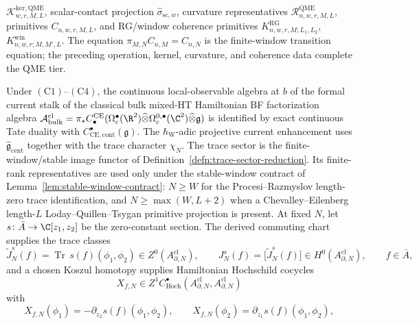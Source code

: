 \documentclass[11pt]{memoir}
\begin{document}
\begin{thm}
\begin{enumerate}[label=\textup{(\roman*)}]
      \(\mathcal K^{\mathrm{ker,QME}}_{w,r,M,L}\), scalar-contact
      projection \(\widehat\sigma_{\mathrm{sc},w}\), curvature
      representatives \(\mathcal R^{\mathrm{QME}}_{n,w,r,M,L}\),
      primitives \(C_{n,w,r,M,L}\), and RG/window coherence primitives
      \(K^{\mathrm{RG}}_{n,w,r,M;L_1,L_2}\),
      \(K^{\mathrm{win}}_{n,w,r;M,M',L}\).  The equation
      \(\pi_{M,N}C_{n,M}=C_{n,N}\) is the finite-window transition
      equation; the preceding operation, kernel, curvature, and
      coherence data complete the QME tier.
  \end{enumerate}
  Under \(\mathrm{(C1)}\)--\(\mathrm{(C4)}\), the continuous
  local-observable algebra at \(b\) of the formal
  current stalk of the classical bulk mixed-HT Hamiltonian BF factorization algebra
  $\mathcal A^{\mathrm{cl}}_{\mathrm{bulk}}=\pi_*
  C^{\mathrm{CE}}_\bullet(\Omega^\bullet_c(\R^2)
  \widehat\otimes\Omega^{0,\bullet}_c(\C^2)
  \widehat\otimes\mathfrak g)$
  is identified by exact continuous Tate duality with
  \(C^\bullet_{\mathrm{CE},\mathrm{cont}}(\mathfrak g)\).  The
  \(\hbar_{\mathrm W}\)-adic projective current enhancement uses
  \(\widehat{\mathfrak g}_{\mathrm{cent}}\) together with the trace
  character \(\chi_N\).  The trace sector is the
  finite-window/stable image functor of
  Definition~\ref{defn:trace-sector-reduction}.  Its finite-rank
  representatives are used only under the stable-window contract of
  Lemma~\ref{lem:stable-window-contract}: \(N\geq W\) for the
  Procesi--Razmyslov length-zero trace identification, and
  \(N\geq\max(W,L+2)\) when a Chevalley--Eilenberg length-\(L\)
  Loday--Quillen--Tsygan primitive projection is present.  At fixed
  \(N\), let \(s\colon\bar A\to\C[z_1,z_2]\) be the zero-constant
  section.  The derived commuting chart supplies the trace classes
  \begin{equation}\label{eq:finite-N-generator-assignment}
    \widetilde J_N^s(f)
      =\operatorname{Tr}\,s(f)(\phi_1,\phi_2)
      \in Z^0(A^{\mathrm{cl}}_{\partial,N}),
    \qquad
    J_N^s(f)=\bigl[\widetilde J_N^s(f)\bigr]
      \in H^0(A^{\mathrm{cl}}_{\partial,N}),
    \qquad f\in\bar A,
  \end{equation}
  and a chosen Koszul homotopy supplies Hamiltonian Hochschild cocycles
  \[
    X_{f,N}\in Z^1C^\bullet_{\mathrm{Hoch}}\!\left(
      A^{\mathrm{cl}}_{\partial,N},
      A^{\mathrm{cl}}_{\partial,N}\right)
  \]
  with
  \begin{equation}\label{eq:schouten-explicit}
    X_{f,N}(\phi_1)=-\partial_{z_2}s(f)(\phi_1,\phi_2),\qquad
    X_{f,N}(\phi_2)=\partial_{z_1}s(f)(\phi_1,\phi_2),

\end{equation}
\end{thm}
\end{document}
